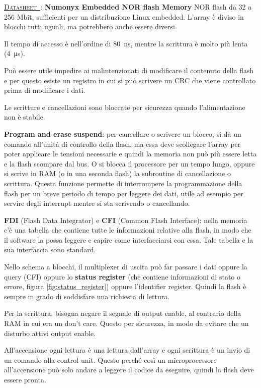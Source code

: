 \documentclass[11pt,4paper]{report}
\newcounter{datasheetcnt}
\renewcommand{\thedatasheetcnt}{\arabic{datasheetcnt}}
\newenvironment{datasheet}[2]{\refstepcounter{datasheetcnt}\par\bigskip\medskip \label{#2}
	\noindent \underline{\textsc{Datasheet~\thedatasheetcnt}}: \textbf{#1} \newline}{\medskip}
\begin{document}
\begin{datasheet}{Numonyx Embedded NOR flash Memory}{}
NOR flash da 32 a 256 Mbit, sufficienti per un distribuzione Linux embedded. L'array è diviso in blocchi tutti uguali, ma potrebbero anche essere diversi. 

Il tempo di accesso è nell'ordine di \SI{80}{\nano\second}, mentre la scrittura è molto più lenta (\SI{4}{\micro\second}).

Può essere utile impedire ai malintenzionati di modificare il contenuto della flash e per questo esiste un registro in cui si può scrivere un CRC che viene controllato prima di modificare i dati.

Le scritture e cancellazioni sono bloccate per sicurezza quando l'alimentazione non è stabile.

\textbf{Program and erase suspend}: per cancellare o scrivere un blocco, si dà un comando all'unità di controllo della flash, ma essa deve scollegare l'array per poter applicare le tensioni necessarie e quindi la memoria non può più essere letta e la flash scompare dal bus. O si blocca il processore per un tempo lungo, oppure si scrive in RAM (o in una seconda flash) la subroutine di cancellazione o scrittura. Questa funzione permette di interrompere la programmazione della flash per un breve periodo di tempo per leggere dei dati, utile ad esempio per servire degli interrupt mentre si sta scrivendo o cancellando.

\textbf{FDI} (Flash Data Integrator) e \textbf{CFI} (Common Flash Interface): nella memoria c'è una tabella che contiene tutte le informazioni relative alla flash, in modo che il software la possa leggere e capire come interfacciarsi con essa. Tale tabella e la sua interfaccia sono standard.

Nello schema a blocchi, il multiplexer di uscita può far passare i dati oppure la query (CFI) oppure lo \textbf{status register} (che contiene informazioni di stato o errore, figura \ref{fig:status_register}) oppure l'identifier register. Quindi la flash è sempre in grado di soddisfare una richiesta di lettura.

Per la scrittura, bisogna negare il segnale di output enable, al contrario della RAM in cui era un don't care. Questo per sicurezza, in modo da evitare che un disturbo attivi output enable.

All'accensione ogni lettura è una lettura dall'array e ogni scrittura è un invio di un comando alla control unit. Questo perché così un microprocessore all'accensione può solo andare a leggere il codice da eseguire, quindi la flash deve essere pronta.


\end{datasheet}
\end{document}
